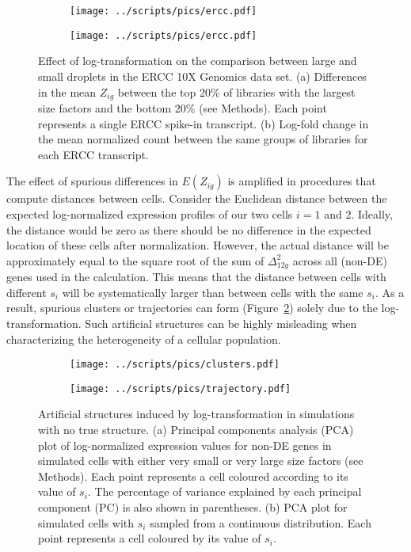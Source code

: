 \documentclass[10pt,letterpaper]{article}
\begin{document}
\begin{figure}
\centering
\begin{subfigure}[b]{0.49\textwidth}
    \texttt{[image: ../scripts/pics/ercc.pdf]}
    \caption{}
\end{subfigure}
\begin{subfigure}[b]{0.49\textwidth}
    \texttt{[image: ../scripts/pics/ercc.pdf]}
    \caption{}
\end{subfigure}
\caption{Effect of log-transformation on the comparison between large and small droplets in the ERCC 10X Genomics data set.
(a) Differences in the mean $Z_{ig}$ between the top 20\% of libraries with the largest size factors and the bottom 20\% (see Methods).
Each point represents a single ERCC spike-in transcript.
(b) Log-fold change in the mean normalized count between the same groups of libraries for each ERCC transcript.}
\label{fig:ercc}
\end{figure}

The effect of spurious differences in $E(Z_{ig})$ is amplified in procedures that compute distances between cells.
Consider the Euclidean distance between the expected log-normalized expression profiles of our two cells $i=1$ and 2.
Ideally, the distance would be zero as there should be no difference in the expected location of these cells after normalization.
However, the actual distance will be approximately equal to the square root of the sum of $\Delta_{12g}^2$ across all (non-DE) genes used in the calculation.
This means that the distance between cells with different $s_i$ will be systematically larger than between cells with the same $s_i$.
As a result, spurious clusters or trajectories can form (Figure~\ref{fig:structures}) solely due to the log-transformation.
Such artificial structures can be highly misleading when characterizing the heterogeneity of a cellular population.

\begin{figure}[btp]
\centering
\begin{subfigure}[b]{0.49\textwidth}
    \texttt{[image: ../scripts/pics/clusters.pdf]}
    \caption{}
\end{subfigure}
\begin{subfigure}[b]{0.49\textwidth}
    \texttt{[image: ../scripts/pics/trajectory.pdf]}
    \caption{}
\end{subfigure}
\caption{Artificial structures induced by log-transformation in simulations with no true structure.
(a) Principal components analysis (PCA) plot of log-normalized expression values for non-DE genes in simulated cells with either very small or very large size factors (see Methods).
Each point represents a cell coloured according to its value of $s_i$.
The percentage of variance explained by each principal component (PC) is also shown in parentheses. 
(b) PCA plot for simulated cells with $s_i$ sampled from a continuous distribution.
Each point represents a cell coloured by its value of $s_i$.
}
\label{fig:structures}
\end{figure}
\end{document}
